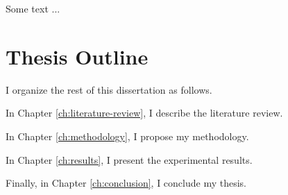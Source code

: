 Some text ...

\section{Thesis Outline}

I organize the rest of this dissertation as follows.

In Chapter \ref{ch:literature-review}, I describe the literature review.

In Chapter \ref{ch:methodology}, I propose my methodology.

In Chapter \ref{ch:results}, I present the experimental results.

Finally, in Chapter \ref{ch:conclusion}, I conclude my thesis.

\FloatBarrier
